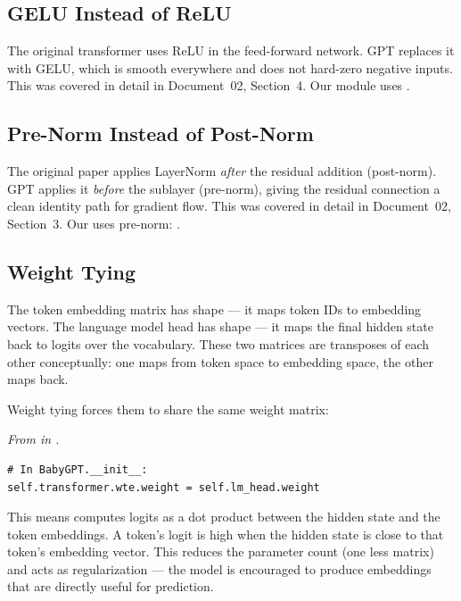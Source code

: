 \subsection{GELU Instead of ReLU}

The original transformer uses ReLU in the feed-forward network. GPT replaces it with GELU, which is smooth everywhere and does not hard-zero negative inputs. This was covered in detail in Document~02, Section~4. Our  module uses .

\subsection{Pre-Norm Instead of Post-Norm}

The original paper applies LayerNorm \emph{after} the residual addition (post-norm). GPT applies it \emph{before} the sublayer (pre-norm), giving the residual connection a clean identity path for gradient flow. This was covered in detail in Document~02, Section~3. Our  uses pre-norm: .

\subsection{Weight Tying}

The token embedding matrix  has shape  --- it maps token IDs to embedding vectors. The language model head  has shape  --- it maps the final hidden state back to logits over the vocabulary. These two matrices are transposes of each other conceptually: one maps from token space to embedding space, the other maps back.

Weight tying forces them to share the same weight matrix:

\concepttag
{\small\itshape From  in .}
\begin{lstlisting}
# In BabyGPT.__init__:
self.transformer.wte.weight = self.lm_head.weight
\end{lstlisting}

This means  computes logits as a dot product between the hidden state and the token embeddings. A token's logit is high when the hidden state is close to that token's embedding vector. This reduces the parameter count (one less  matrix) and acts as regularization --- the model is encouraged to produce embeddings that are directly useful for prediction.

